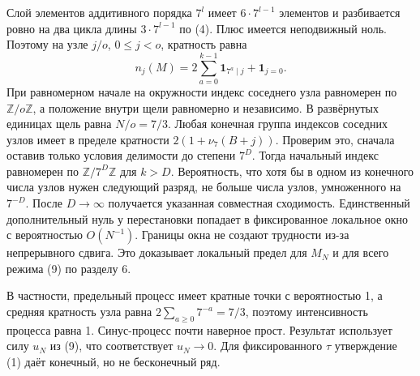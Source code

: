 \documentclass[11pt,a4paper]{article}
\newcommand{\Z}{\mathbb Z}
\begin{document}
Слой элементов аддитивного порядка $7^l$ имеет $6\cdot7^{l-1}$ элементов и разбивается ровно на два цикла длины $3\cdot7^{l-1}$ по (4). Плюс имеется неподвижный ноль. Поэтому на узле $j/o$, $0\le j<o$, кратность равна
\[
         n_j(M)=2\sum_{a=0}^{k-1}\mathbf1_{7^a\mid j}+\mathbf1_{j=0}.
                                                                     \tag{13}
\]
При равномерном начале на окружности индекс соседнего узла равномерен по $\Z/o\Z$, а положение внутри щели равномерно и независимо. В развёрнутых единицах щель равна $N/o=7/3$. Любая конечная группа индексов соседних узлов имеет в пределе кратности $2(1+\nu_7(B+j))$. Проверим это, сначала оставив только условия делимости до степени $7^D$. Тогда начальный индекс равномерен по $\Z/7^D\Z$ для $k>D$. Вероятность, что хотя бы в одном из конечного числа узлов нужен следующий разряд, не больше числа узлов, умноженного на $7^{-D}$. После $D\to\infty$ получается указанная совместная сходимость. Единственный дополнительный нуль у перестановки попадает в фиксированное локальное окно с вероятностью $O(N^{-1})$. Границы окна не создают трудности из-за непрерывного сдвига. Это доказывает локальный предел для $M_N$ и для всего режима (9) по разделу 6.

В частности, предельный процесс имеет кратные точки с вероятностью 1, а средняя кратность узла равна $2\sum_{a\ge0}7^{-a}=7/3$, поэтому интенсивность процесса равна 1. Синус-процесс почти наверное прост. Результат использует силу $u_N$ из (9), что соответствует $u_N\to0$. Для фиксированного $\tau$ утверждение (1) даёт конечный, но не бесконечный ряд.
\end{document}
